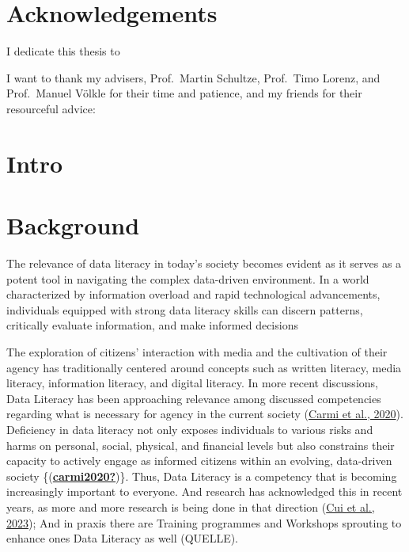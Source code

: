 \documentclass[
  12pt,
  a4paper,
  twoside]{article}
\begin{document}
\hypertarget{acknowledgements}{%
\section*{Acknowledgements}\label{acknowledgements}}

I dedicate this thesis to

I want to thank my advisers, Prof.~Martin Schultze, Prof.~Timo Lorenz, and Prof.~Manuel Völkle for their time and patience, and my friends for their resourceful advice:

\newpage\null\thispagestyle{empty}\newpage

\hypertarget{intro}{%
\section{Intro}\label{intro}}

\hypertarget{background}{%
\section{Background}\label{background}}

The relevance of data literacy in today's society becomes evident as it serves as a potent tool in navigating the complex data-driven environment. In a world characterized by information overload and rapid technological advancements, individuals equipped with strong data literacy skills can discern patterns, critically evaluate information, and make informed decisions

The exploration of citizens' interaction with media and the cultivation of their agency has traditionally centered around concepts such as written literacy, media literacy, information literacy, and digital literacy. In more recent discussions, Data Literacy has been approaching relevance among discussed competencies regarding what is necessary for agency in the current society (\protect\hyperlink{ref-Carmi2020}{Carmi et al., 2020}). Deficiency in data literacy not only exposes individuals to various risks and harms on personal, social, physical, and financial levels but also constrains their capacity to actively engage as informed citizens within an evolving, data-driven society \{(\protect\hyperlink{ref-carmi2020}{\textbf{carmi2020?}})\}. Thus, Data Literacy is a competency that is becoming increasingly important to everyone. And research has acknowledged this in recent years, as more and more research is being done in that direction (\protect\hyperlink{ref-Cui2023}{Cui et al., 2023}); And in praxis there are Training programmes and Workshops sprouting to enhance ones Data Literacy as well (QUELLE).
\end{document}
